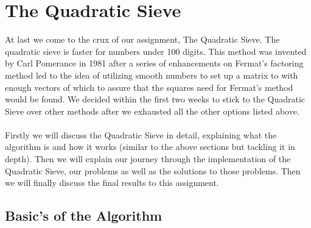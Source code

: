 \documentclass[12pt]{article} %
\begin{document}
\section{The Quadratic Sieve}
At last we come to the crux of our assignment, The Quadratic Sieve. The quadratic sieve is faster for numbers under 100 digits\cite{pomerance}. This method was invented by Carl Pomerance in 1981 after a series of enhancements on Fermat's factoring method led to the idea of utilizing smooth numbers to set up a matrix to with enough vectors of which to assure that the squares need for Fermat's method would be found. We decided within the first two weeks to stick to the Quadratic Sieve over other methods after we exhausted all the other options listed above.
\\\\
Firstly we will discuss the Quadratic Sieve in detail, explaining what the algorithm is and how it works (similar to the above sections but tackling it in depth). Then we will explain our journey through the implementation of the Quadratic Sieve, our problems as well as the solutions to those problems. Then we will finally discuss the final results to this assignment.
\subsection{Basic's of the Algorithm}
\end{document}
